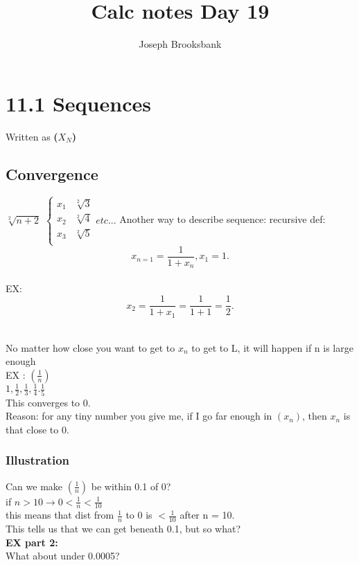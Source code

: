 \documentclass[]{report}
\title{Calc notes Day 19}
\author{Joseph Brooksbank}
\begin{document}
\maketitle
\section*{11.1 Sequences}
Written as \textbf{($X_N$)}
\subsection*{Convergence}

\noindent{}
$ \sqrt[2]{n + 2} $
$
\begin{cases}
        x_1 & \sqrt[2]{3} \\
        x_2 & \sqrt[2]{4} \\
        x_3 & \sqrt[2]{5} \\  

\end{cases} etc...
$
Another way to describe sequence: recursive def:
\[
        x_{n=1} = \frac{1}{1 + x_n}, x_1 = 1
.\] 
\\EX:\\
\[
     x_2  = \frac{1}{1+x_1}= \frac{1}{1+1}=\frac{1}{2}
.\]  

\noindent{}
\\
\noindent{} No matter how close you want to get to $x_n$ to get to L, it will happen if n is large enough
\\
EX : $(\frac{1}{n})$ 
\\
$1, \frac{1}{2}, \frac{1}{3}, \frac{1}{4}. \frac{1}{5}$
\\ This converges to 0.
\\
Reason: for any tiny number  you give me, if I go far enough in $(x_n)$, then $x_n$ is that close to 0. 
\subsubsection*{Illustration}
Can we make $(\frac{1}{n})$ be within 0.1 of 0?
\\ 
if  $n > 10 \to 0 < \frac{1}{n} < \frac{1}{10} $ 
\\ 
this means that dist from $\frac{1}{n}$ to 0 is $< \frac{1}{10}$ after n = 10. 
\\ This tells us that we can get beneath 0.1, but so what? 
\\
\textbf{EX part 2:}
\\
What about under 0.0005?
\\
\clearpage
\end{document}
